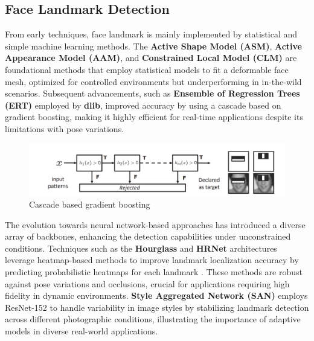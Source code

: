 \subsection{Face  Landmark Detection}
From early techniques, face landmark is mainly implemented by statistical and simple machine learning methods. The \textbf{Active Shape Model (ASM)}, \textbf{Active Appearance Model (AAM)}, and \textbf{Constrained Local Model (CLM)} \cite{WANG201850} \cite{Khabarlak_2022} are foundational methods that employ statistical models to fit a deformable face mesh, optimized for controlled environments but underperforming in in-the-wild scenarios. Subsequent advancements, such as \textbf{Ensemble of Regression Trees (ERT)} \cite{Kazemi_2014_CVPR} employed by \textbf{dlib}, improved accuracy by using a cascade based on gradient boosting\cite{saberian2014boosting}, making it highly efficient for real-time applications despite its limitations with pose variations.

\begin{figure}[htb]
    \centering
    \includegraphics[width=1\textwidth]{figures/Introduction/cascade.png}
    \caption{Cascade based gradient boosting }\label{F:test-a}
\end{figure}

The evolution towards neural network-based approaches has introduced a diverse array of backbones, enhancing the detection capabilities under unconstrained conditions. Techniques such as the \textbf{Hourglass} \cite{Newell_2016_ECCV} and \textbf{HRNet} \cite{Sun_2019_CVPR} architectures leverage heatmap-based methods to improve landmark localization accuracy by predicting probabilistic heatmaps for each landmark . These methods are robust against pose variations and occlusions, crucial for applications requiring high fidelity in dynamic environments.
\textbf{Style Aggregated Network (SAN)}\cite{Dong_2018_CVPR} employs ResNet-152 \cite{He_2016_CVPR} to handle variability in image styles by stabilizing landmark detection across different photographic conditions, illustrating the importance of adaptive models in diverse real-world applications.

